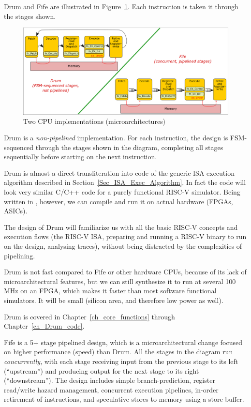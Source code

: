 Drum and Fife are illustrated in
Figure~\ref{Fig_Two_Microarchitectures}.  Each instruction is taken it
through the stages shown.
\begin{figure}[htbp]
  \centerline{\includegraphics[width=6in,angle=0]{Figures/Fig_Two_Microarchitectures}}
  \caption{\label{Fig_Two_Microarchitectures}Two CPU implementations (microarchitectures)}
\end{figure}

Drum is a \emph{non-pipelined} implementation.  For each instruction,
the design is FSM-sequenced through the stages shown in the diagram,
completing all stages sequentially before starting on the next
instruction.

Drum is almost a direct transliteration into {\BSV} code of the generic
ISA execution algorithm described in
Section~\ref{Sec_ISA_Exec_Algorithm}.  In fact the {\BSV} code will look
very similar C/C++ code for a purely functional RISC-V simulator.
Being written in {\BSV}, however, we can compile and run it on actual
hardware (FPGAs, ASICs).
       
The design of Drum will familiarize us with all the basic RISC-V
concepts and execution flows (the RISC-V ISA, preparing and running a
RISC-V binary to run on the design, analysing traces), without being
distracted by the complexities of pipelining.

Drum is not fast compared to Fife or other hardware CPUs, because of
its lack of microarchitectural features, but we can still synthesize
it to run at several 100 MHz on an FPGA, which makes it faster than
most software functional simulators.  It will be small (silicon area,
and therefore low power as well).

Drum is covered in Chapter~\ref{ch_core_functions} through
Chapter~\ref{ch_Drum_code}.

Fife is a 5+ stage pipelined design, which is a microarchitectural
change focused on higher performance (speed) than Drum.  All the
stages in the diagram run \emph{concurrently}, with each stage
receiving input from the previous stage to its left (``upstream'') and
producing output for the next stage to its right (``downstream'').
The design includes simple branch-prediction, register read/write
hazard management, concurrent execution pipelines, in-order retirement
of instructions, and speculative stores to memory using a
store-buffer.

